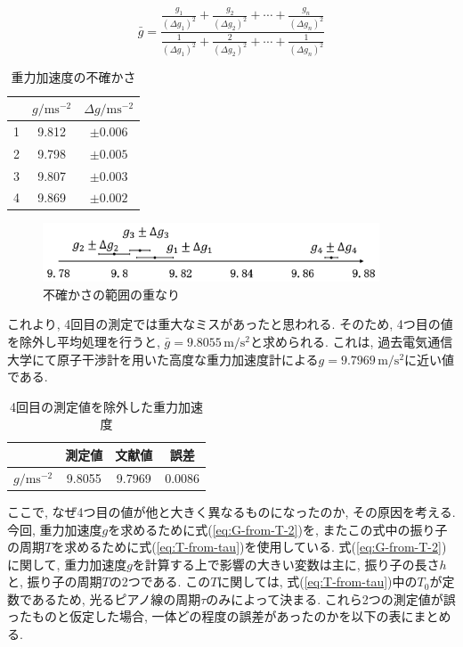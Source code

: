 \documentclass{jarticle}
\begin{document}
\begin{equation}
  \bar{g}=\frac{
    \frac{g_1}{(\Delta g_1)^2} + \frac{g_2}{(\Delta g_2)^2}+\cdots+\frac{g_n}{(\Delta g_n)^2}
  }{
    \frac{1}{(\Delta g_1)^2} + \frac{2}{(\Delta g_2)^2}+\cdots+\frac{1}{(\Delta g_n)^2}
  }
\end{equation}

\begin{table}[H]
  \centering
  \caption{重力加速度の不確かさ}
  \begin{tabular}{ccc}
    \hline
    & $g/\mathrm{ms^{-2}}$ & $\Delta g/\mathrm{ms^{-2}}$ \\
    \hline
    1 & 9.812 & $\pm 0.006$ \\
    2 & 9.798 & $\pm 0.005$ \\
    3 & 9.807 & $\pm 0.003$ \\
    4 & 9.869 & $\pm 0.002$ \\
    \hline
  \end{tabular}
\end{table}

\begin{figure}[H]
  \begin{center}
  \includegraphics[width=100mm]{uncertainty_graph.png}
  \caption{不確かさの範囲の重なり}
  \end{center}
\end{figure}

これより, 4回目の測定では重大なミスがあったと思われる.
そのため, 4つ目の値を除外し平均処理を行うと, $\bar{g}=9.8055\,\mathrm{m/s^2}$と求められる.
これは, 過去電気通信大学にて原子干渉計を用いた高度な重力加速度計による$g=9.7969\,\mathrm{m/s^2}$に近い値である.\cite{uec-atom}

\begin{table}[h]
  \centering
  \caption{4回目の測定値を除外した重力加速度}
  \begin{tabular}{cccc}
    \hline
    & 測定値 & 文献値\cite{uec-atom} & 誤差 \\
    \hline
    $g/\mathrm{ms^{-2}}$ & 9.8055 & 9.7969 & 0.0086 \\
    \hline
  \end{tabular}
\end{table}

ここで, なぜ4つ目の値が他と大きく異なるものになったのか, その原因を考える.
今回, 重力加速度$g$を求めるために式(\ref{eq:G-from-T-2})を, またこの式中の振り子の周期$T$を求めるために式(\ref{eq:T-from-tau})を使用している.
式(\ref{eq:G-from-T-2})に関して, 重力加速度$g$を計算する上で影響の大きい変数は主に, 振り子の長さ$h$と, 振り子の周期$T$の2つである.
この$T$に関しては, 式(\ref{eq:T-from-tau})中の$T_0$が定数であるため, 光るピアノ線の周期$\tau$のみによって決まる.
これら2つの測定値が誤ったものと仮定した場合, 一体どの程度の誤差があったのかを以下の表にまとめる.
\end{document}
